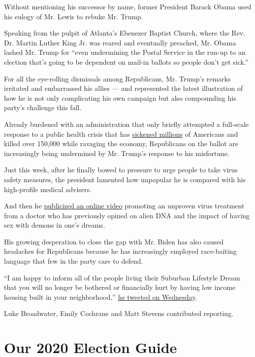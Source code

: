 Without mentioning his successor by name, former President Barack Obama
used his eulogy of Mr. Lewis to rebuke Mr. Trump.

Speaking from the pulpit of Atlanta's Ebenezer Baptist Church, where the
Rev. Dr. Martin Luther King Jr. was reared and eventually preached, Mr.
Obama lashed Mr. Trump for ``even undermining the Postal Service in the
run-up to an election that's going to be dependent on mail-in ballots so
people don't get sick.''

For all the eye-rolling dismissals among Republicans, Mr. Trump's
remarks irritated and embarrassed his allies --- and represented the
latest illustration of how he is not only complicating his own campaign
but also compounding his party's challenge this fall.

Already burdened with an administration that only briefly attempted a
full-scale response to a public health crisis that has
\href{https://www.nytimes3xbfgragh.onion/interactive/2020/us/coronavirus-us-cases.html}{sickened
millions} of Americans and killed over 150,000 while ravaging the
economy, Republicans on the ballot are increasingly being undermined by
Mr. Trump's response to his misfortune.

Just this week, after he finally bowed to pressure to urge people to
take virus safety measures, the president lamented how unpopular he is
compared with his high-profile medical advisers.

And then he
\href{https://www.nytimes3xbfgragh.onion/2020/07/28/technology/virus-video-trump.html}{publicized
an online video} promoting an unproven virus treatment from a doctor who
has previously opined on alien DNA and the impact of having sex with
demons in one's dreams.

His growing desperation to close the gap with Mr. Biden has also caused
headaches for Republicans because he has increasingly employed
race-baiting language that few in the party care to defend.

``I am happy to inform all of the people living their Suburban Lifestyle
Dream that you will no longer be bothered or financially hurt by having
low income housing built in your neighborhood,''
\href{https://www.nytimes3xbfgragh.onion/2020/07/29/us/politics/trump-suburbs-housing-white-voters.html}{he
tweeted on Wednesday}.

Luke Broadwater, Emily Cochrane and Matt Stevens contributed reporting.

\hypertarget{our-2020-election-guide}{%
\section{Our 2020 Election Guide}\label{our-2020-election-guide}}

